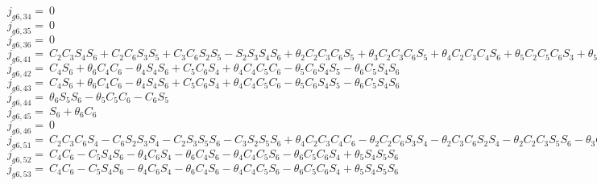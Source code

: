 \begin{appendices}
$j_{g6,34} =\  0$\\
$j_{g6,35} =\  0$\\
$j_{g6,36} =\  0$\\
$j_{g6,41} =\  C_2C_3S_4S_6 + C_2C_6S_3S_5 + C_3C_6S_2S_5 - S_2S_3S_4S_6 + \theta _2C_2C_3C_6S_5 + \theta _3C_2C_3C_6S_5 + \theta _4C_2C_3C_4S_6 + \theta _5C_2C_5C_6S_3 + \theta _5C_3C_5C_6S_2 + \theta _6C_2C_3C_6S_4 - \theta _2C_2S_3S_4S_6 - \theta _2C_3S_2S_4S_6 - \theta _2C_6S_2S_3S_5 - \theta _3C_2S_3S_4S_6 - \theta _3C_3S_2S_4S_6 - \theta _3C_6S_2S_3S_5 - \theta _4C_4S_2S_3S_6 - \theta _6C_6S_2S_3S_4 - \theta _6C_2S_3S_5S_6 - \theta _6C_3S_2S_5S_6 - C_2C_3C_4C_5C_6 + C_4C_5C_6S_2S_3 + \theta_2C_2C_4C_5C_6S_3 + \theta _2C_3C_4C_5C_6S_2 + \theta _3C_2C_4C_5C_6S_3 + \theta _3C_3C_4C_5C_6S_2 + \theta _4C_2C_3C_5C_6S_4 + \theta _5C_2C_3C_4C_6S_5 + \theta_6C_2C_3C_4C_5S_6 - \theta _4C_5C_6S_2S_3S_4 - \theta _5C_4C_6S_2S_3S_5 - \theta _6C_4C_5S_2S_3S_6$\\
$j_{g6,42} =\  C_4S_6 + \theta _6C_4C_6 - \theta _4S_4S_6 + C_5C_6S_4 + \theta _4C_4C_5C_6 - \theta _5C_6S_4S_5 - \theta _6C_5S_4S_6$\\
$j_{g6,43} =\  C_4S_6 + \theta _6C_4C_6 - \theta _4S_4S_6 + C_5C_6S_4 + \theta _4C_4C_5C_6 - \theta _5C_6S_4S_5 - \theta _6C_5S_4S_6$\\
$j_{g6,44} =\  \theta _6S_5S_6 - \theta _5C_5C_6 - C_6S_5$\\
$j_{g6,45} =\  S_6 + \theta _6C_6$\\
$j_{g6,46} =\  0$\\
$j_{g6,51} =\  C_2C_3C_6S_4 - C_6S_2S_3S_4 - C_2S_3S_5S_6 - C_3S_2S_5S_6 + \theta _4C_2C_3C_4C_6 - \theta _2C_2C_6S_3S_4 - \theta _2C_3C_6S_2S_4 - \theta _2C_2C_3S_5S_6 - \theta _3C_2C_6S_3S_4 - \theta _3C_3C_6S_2S_4 - \theta _3C_2C_3S_5S_6 - \theta _4C_4C_6S_2S_3 - \theta _5C_2C_5S_3S_6 - \theta _5C_3C_5S_2S_6 - \theta _6C_2C_3S_4S_6 - \theta _6C_2C_6S_3S_5 - \theta _6C_3C_6S_2S_5 + \theta _2S_2S_3S_5S_6 + \theta _3S_2S_3S_5S_6 + \theta _6S_2S_3S_4S_6 + C_2C_3C_4C_5S_6 - C_4C_5S_2S_3S_6 + \theta _6C_2C_3C_4C_5C_6  - \theta _2C_2C_4C_5S_3S_6 - \theta _2C_3C_4C_5S_2S_6 - \theta _3C_2C_4C_5S_3S_6 - \theta _3C_3C_4C_5S_2S_6 - \theta _4C_2C_3C_5S_4S_6 - \theta _5C_2C_3C_4S_5S_6 - \theta _6C_4C_5C_6S_2S_3 + \theta _4C_5S_2S_3S_4S_6 + \theta _5C_4S_2S_3S_5S_6$\\
$j_{g6,52} =\  C_4C_6 - C_5S_4S_6 - \theta _4C_6S_4 - \theta _6C_4S_6 - \theta _4C_4C_5S_6 - \theta _6C_5C_6S_4 + \theta _5S_4S_5S_6$\\
$j_{g6,53} =\  C_4C_6 - C_5S_4S_6 - \theta _4C_6S_4 - \theta _6C_4S_6 - \theta _4C_4C_5S_6 - \theta _6C_5C_6S_4 + \theta _5S_4S_5S_6$\\

\end{appendices}
